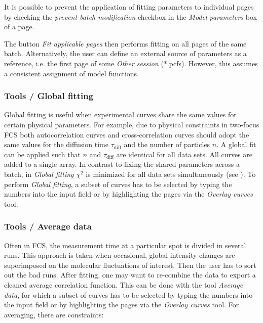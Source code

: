 It is possible to prevent the application of fitting parameters to individual pages by checking the \textit{prevent batch modification} checkbox in the \textit{Model parameters} box of a page.

The button \textit{Fit applicable pages} then performs fitting on all pages of the same batch. Alternatively, the user can define an external source of parameters as a reference, i.e. the first page of some \textit{Other session} (*.pcfs). However, this assumes a consistent assignment of model functions.



\subsubsection{Tools / Global fitting}
\label{sec:menub.tools.globa}
Global fitting is useful when experimental curves share the same values for certain physical parameters. For example, due to physical constraints in two-focus FCS both autocorrelation curves and  cross-correlation curves should adopt the same values for the diffusion time $\tau_\mathrm{diff}$ and the number of particles $n$. A global fit can be applied such that $n$ and $\tau_\mathrm{diff}$ are identical for all data sets. All curves are added to a single array. In contrast to fixing the shared parameters across a batch, in \textit{Global fitting} $\chi^2$  is minimized for all data sets simultaneously (see ). To perform \textit{Global fitting}, a subset of curves has to be selected by typing the numbers into the input field or by highlighting the pages via the \textit{Overlay curves} tool. 

\subsubsection{Tools / Average data}
\label{sec:menub.tools.avera}
Often in FCS, the measurement time at a particular spot is divided in several runs. This approach is taken when occasional, global intensity changes are superimposed on the molecular fluctuations of interest. Then the user has to sort out the bad runs. After fitting, one may want to re-combine the data to export a cleaned average correlation function. This can be done with the tool \textit{Average data}, for which a subset of curves has to be selected by typing the numbers into the input field or by highlighting the pages via the \textit{Overlay curves} tool. For averaging, there are constraints:


